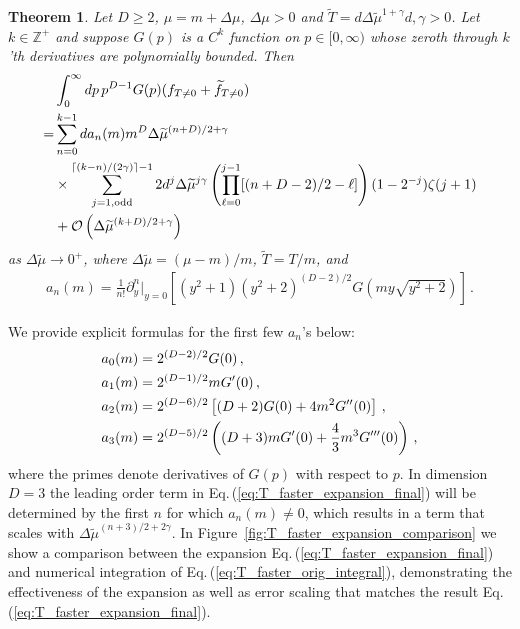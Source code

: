 \documentclass[sn-mathphys,Numbered]{sn-jnl}
\newcommand{\req}[1]{Eq.\,(\ref{#1})}
\newcommand{\rf}[1]{Figure~{\ref{#1}}}
\newtheorem{theorem}{Theorem}
\begin{document}
\begin{theorem}\label{thms:T_decay_faster}
Let $D\geq 2$, $\mu=m+\Delta\mu$, $\Delta\mu>0$ and $\widetilde{T}=d\Delta\widetilde{\mu}^{1+\gamma}$$d,\gamma>0$. Let $k\in\mathbb{Z}^+$ and suppose $G(p)$ is a $C^k$ function on $p\in[0,\infty)$ whose zeroth through $k$'th derivatives are polynomially bounded. Then
\begin{align}
 &\int_0^\infty dp\, p^{D-1} G(p)(f_{T\neq 0}+\widetilde{f}_{T\neq 0})\label{eq:T_faster_orig_integral}\\
 =& \sum_{n=0}^{k-1} da_n(m)m^{D}\Delta\widetilde{\mu}^{(n+D)/2+\gamma}\label{eq:T_faster_expansion_final}\\
 &\times\sum_{j=1,\mathrm{odd}}^{\lceil(k-n)/(2\gamma)\rceil-1}
 2d^j\Delta\widetilde{\mu}^{j\gamma}\left(\prod_{\ell=0}^{j-1}[(n+D-2)/2-\ell] \right)(1-2^{-j})\zeta(j+1) \notag\\
 &+\mathcal{O}\left(\Delta\widetilde{\mu}^{(k+D)/2+\gamma}\right)\notag
\end{align} 
as $\Delta\widetilde{\mu}\to 0^+$, where $\Delta\widetilde{\mu}=(\mu-m)/m$, $\widetilde{T}=T/m$, and
\begin{align}\label{eq:an_def}
a_n(m)=\frac{1}{n!}\partial_y^n|_{y=0}\left[ (y^2+1)( y^2+2)^{(D-2)/2} G\left(my\sqrt{y^2+2}\right)\right]\,.
\end{align}
\end{theorem}
We provide explicit formulas for the first few $a_n$'s below:
\begin{align}\label{eq:first_few_a_ns}
 &a_0(m)=2^{(D-2)/2} G(0)\,,\\
 &a_1(m)=2^{(D-1)/2}mG^\prime(0)\,,\notag\\
 &a_2(m)=2^{(D-6)/2}\left[(D+2)G(0)+4m^2 G^{\prime\prime}(0)\right]\,,\notag\\
 &a_3(m)=2^{(D - 5)/2} \left((D + 3) m G^\prime(0) + \frac{4}{3}m^3 G^{\prime\prime\prime}(0) \right)\,,\notag
\end{align}
where the primes denote derivatives of $G(p)$ with respect to $p$. In dimension $D=3$ the leading order term in \req{eq:T_faster_expansion_final} will be determined by the first $n$ for which $a_n(m)\neq 0$, which results in a term that scales with  $\Delta\widetilde{\mu}^{(n+3)/2+2\gamma}$. In \rf{fig:T_faster_expansion_comparison} we show a comparison between the expansion \req{eq:T_faster_expansion_final} and numerical integration of \req{eq:T_faster_orig_integral}, demonstrating the effectiveness of the expansion as well as error scaling that matches the result \req{eq:T_faster_expansion_final}.
\end{document}

